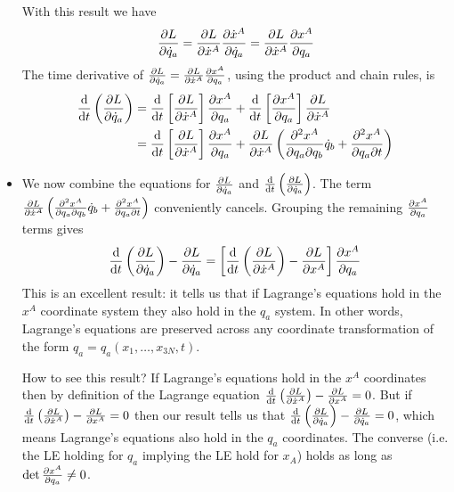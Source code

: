 \documentclass[11pt, a4paper]{article}
\begin{document}
\begin{itemize}
	With this result we have
	\begin{equation*}
		\pdv{L}{\dot{q}_{a}} = \pdv{L}{\dot{x}^{A}} \pdv{\dot{x}^{A}}{\dot{q}_{a}} = \pdv{L}{\dot{x}^{A}} \pdv{x^{A}}{q_{a}} 
	\end{equation*}
	The time derivative of $ \pdv{L}{\dot{q}_{a}} = \pdv{L}{\dot{x}^{A}} \pdv{x^{A}}{q_{a}}  $, using the product and chain rules, is
	\begin{align*}
		\dv{}{t} \left (\pdv{L}{\dot{q}_{a}}\right) &= \dv{}{t}\left[\pdv{L}{\dot{x}^{A}}\right]\pdv{x^{A}}{q_{a}}  +  \dv{}{t}\left[\pdv{x^{A}}{q_{a}} \right] \pdv{L}{\dot{x}^{A}}\\
		&= \dv{}{t}\left[\pdv{L}{\dot{x}^{A}}\right]\pdv{x^{A}}{q_{a}}  +  \pdv{L}{\dot{x}^{A}} \left(\pdv{x^{A}}{q_{a}}{q_{b}}\dot{q}_{b} + \pdv{x^{A}}{q_{a}}{t}\right)
	\end{align*}
	
	\item We now combine the equations for $ \pdv{L}{\dot{q}_{a}}  $ and $ \dv{}{t} \left (\pdv{L}{\dot{q}_{a}}\right)  $. The term $  \pdv{L}{\dot{x}^{A}}\left(\pdv{x^{A}}{q_{a}}{q_{b}}\dot{q}_{b}+ \pdv{x^{A}}{q_{a}}{t} \right) $ conveniently cancels. Grouping the remaining $ \pdv{x^{A}}{q_{a}} $ terms gives
	\begin{equation*}
		\dv{}{t}  \left (\pdv{L}{\dot{q}_{a}}\right)  - \pdv{L}{\dot{q}_{a}} =\left[ \dv{}{t}\left(\pdv{L}{\dot{x}^{A}}\right) - \pdv{L}{x^{A}}\right]\pdv{x^{A}}{q_{a}}
	\end{equation*}
	This is an excellent result: it tells us that if Lagrange's equations hold in the $ x^{A} $ coordinate system they also hold in the $ q_{a} $ system. In other words, Lagrange's equations are preserved across any coordinate transformation of the form $ q_{a} = q_{a}(x_{1}, \ldots, x_{3N}, t) $.
	
	How to see this result? If Lagrange's equations hold in the $ x^{A} $ coordinates then by definition of the Lagrange equation $ \dv{}{t}\left(\pdv{L}{\dot{x}^{A}}\right) - \pdv{L}{x^{A}} = 0 $. But if $ \dv{}{t}\left(\pdv{L}{\dot{x}^{A}}\right) - \pdv{L}{x^{A}} = 0 $ then our result tells us that $ \dv{}{t}  \left (\pdv{L}{\dot{q}_{a}}\right) - \pdv{L}{\dot{q}_{a}} = 0 $, which means Lagrange's equations also hold in the $ q_{a} $ coordinates. The converse (i.e. the LE holding for $ q_{a} $ implying the LE hold for $ x_{A} $) holds as long as $ \det \pdv{x^{A}}{q_{a}} \neq 0$. 
	
\end{itemize}
\end{document}
